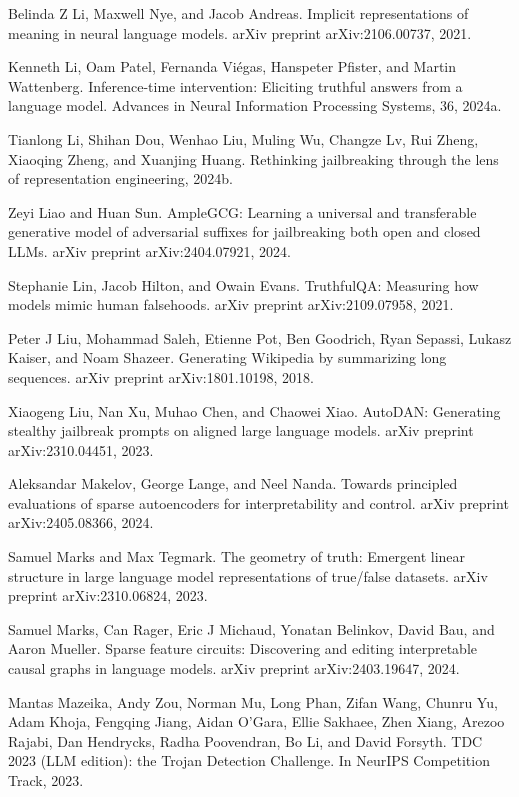 \documentclass[10pt]{article}
\begin{document}
Belinda Z Li, Maxwell Nye, and Jacob Andreas. Implicit representations of meaning in neural language models. arXiv preprint arXiv:2106.00737, 2021.

Kenneth Li, Oam Patel, Fernanda Viégas, Hanspeter Pfister, and Martin Wattenberg. Inference-time intervention: Eliciting truthful answers from a language model. Advances in Neural Information Processing Systems, 36, 2024a.

Tianlong Li, Shihan Dou, Wenhao Liu, Muling Wu, Changze Lv, Rui Zheng, Xiaoqing Zheng, and Xuanjing Huang. Rethinking jailbreaking through the lens of representation engineering, 2024b.

Zeyi Liao and Huan Sun. AmpleGCG: Learning a universal and transferable generative model of adversarial suffixes for jailbreaking both open and closed LLMs. arXiv preprint arXiv:2404.07921, 2024.

Stephanie Lin, Jacob Hilton, and Owain Evans. TruthfulQA: Measuring how models mimic human falsehoods. arXiv preprint arXiv:2109.07958, 2021.

Peter J Liu, Mohammad Saleh, Etienne Pot, Ben Goodrich, Ryan Sepassi, Lukasz Kaiser, and Noam Shazeer. Generating Wikipedia by summarizing long sequences. arXiv preprint arXiv:1801.10198, 2018.

Xiaogeng Liu, Nan Xu, Muhao Chen, and Chaowei Xiao. AutoDAN: Generating stealthy jailbreak prompts on aligned large language models. arXiv preprint arXiv:2310.04451, 2023.

Aleksandar Makelov, George Lange, and Neel Nanda. Towards principled evaluations of sparse autoencoders for interpretability and control. arXiv preprint arXiv:2405.08366, 2024.

Samuel Marks and Max Tegmark. The geometry of truth: Emergent linear structure in large language model representations of true/false datasets. arXiv preprint arXiv:2310.06824, 2023.

Samuel Marks, Can Rager, Eric J Michaud, Yonatan Belinkov, David Bau, and Aaron Mueller. Sparse feature circuits: Discovering and editing interpretable causal graphs in language models. arXiv preprint arXiv:2403.19647, 2024.

Mantas Mazeika, Andy Zou, Norman Mu, Long Phan, Zifan Wang, Chunru Yu, Adam Khoja, Fengqing Jiang, Aidan O'Gara, Ellie Sakhaee, Zhen Xiang, Arezoo Rajabi, Dan Hendrycks, Radha Poovendran, Bo Li, and David Forsyth. TDC 2023 (LLM edition): the Trojan Detection Challenge. In NeurIPS Competition Track, 2023.
\end{document}
